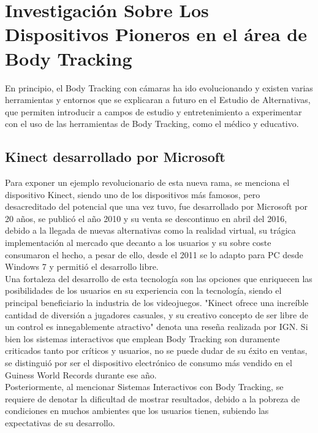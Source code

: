 \section{Investigación Sobre Los Dispositivos Pioneros en el área de Body Tracking}

En principio, el Body Tracking con cámaras ha ido evolucionando y existen varias herramientas y entornos que se explicaran a futuro en el Estudio de Alternativas, que permiten introducir a campos de estudio y entretenimiento a experimentar con el uso de las herramientas de Body Tracking, como el médico y educativo.\\

\subsection{Kinect desarrollado por Microsoft}

Para exponer un ejemplo revolucionario de esta nueva rama, se menciona el dispositivo Kinect, siendo uno de los dispositivos más famosos, pero desacreditado del potencial que una vez tuvo, fue desarrollado por Microsoft por 20 años, se publicó el año 2010 y su venta se descontinuo en abril del 2016, debido a la llegada de nuevas alternativas como la realidad virtual, su trágica implementación al mercado que decanto a los usuarios y  su sobre coste consumaron el hecho, a pesar de ello, desde el 2011 se lo adapto para PC desde Windows 7 y permitió el desarrollo libre. \\

Una fortaleza del desarrollo de esta tecnología son las opciones que enriquecen las posibilidades de los usuarios en su experiencia con la tecnología, siendo el principal beneficiario la industria de los videojuegos. 
"Kinect ofrece una increíble cantidad de diversión a jugadores casuales, y su creativo concepto de ser libre de un control es innegablemente atractivo" denota una reseña realizada por IGN. Si bien los sistemas interactivos que emplean Body Tracking son duramente criticados tanto por críticos y usuarios, no se puede dudar de su éxito en ventas, se distinguió por ser el dispositivo electrónico de consumo más vendido en el Guiness World Records durante ese año.\cite{7934445}\\
Posteriormente, al mencionar Sistemas Interactivos con Body Tracking, se requiere de denotar la dificultad de mostrar resultados, debido a la pobreza de condiciones en muchos ambientes que los usuarios tienen, subiendo las expectativas de su desarrollo. 

